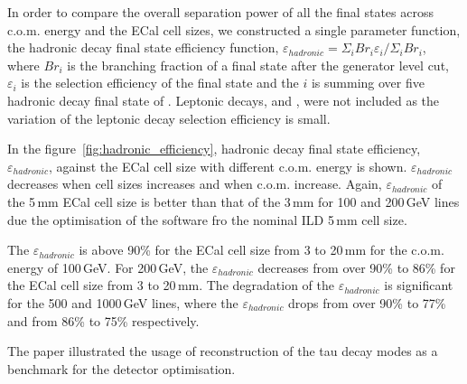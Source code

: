 \documentclass[a4paper,11pt]{article}
\begin{document}
In order to compare the overall separation power of all the final states across c.o.m. energy and the ECal cell sizes, we constructed a single parameter function, the  \Ptau hadronic decay final state efficiency function, $\varepsilon_{hadronic} = \Sigma_{i} {Br}_{i}\varepsilon_{i} / \Sigma_{i} {Br}_{i}$, where $Br_{i}$ is the branching fraction of a final state after the generator level cut, $\varepsilon_{i}$ is the selection efficiency of the final state and the $i$ is summing over five hadronic decay final state of \Ptau. Leptonic decays, \Pelectron and \Pmuon, were not included as the variation of the leptonic decay selection efficiency is small.

In the figure~\ref{fig:hadronic_efficiency}, \Ptau hadronic decay final state efficiency, $\varepsilon_{hadronic}$, against the ECal cell size with different c.o.m. energy is shown. $\varepsilon_{hadronic}$ decreases when cell sizes increases and when c.o.m. increase.  Again, $\varepsilon_{hadronic}$ of the 5\,mm ECal cell size is better than that of the 3\,mm for 100 and 200\,GeV lines due the optimisation of the software fro the nominal ILD 5\,mm cell size.

The $\varepsilon_{hadronic}$ is above 90\% for the ECal cell size from 3 to 20\,mm for the c.o.m. energy of 100\,GeV. For 200\,GeV, the $\varepsilon_{hadronic}$ decreases from over 90\% to 86\% for the ECal cell size from 3 to 20\,mm. The degradation of the $\varepsilon_{hadronic}$ is significant for the 500 and 1000\,GeV lines, where the $\varepsilon_{hadronic}$ drops from over 90\% to 77\%  and from 86\% to 75\% respectively. 


The paper illustrated the usage of reconstruction of the tau decay modes as a benchmark for the detector optimisation. 




\end{document}
